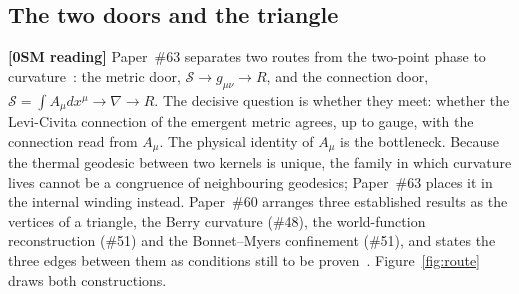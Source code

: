 \documentclass[%
 reprint, amsmath,amssymb, aps, prb, ]{revtex4-2}
\numberwithin{equation}{section}
\begin{document}
\subsection{The two doors and the triangle}

\textbf{[0SM reading]} Paper~\#63 separates two routes from the two-point phase to curvature~\cite{hanamura63}: the metric door, $\mathcal S\to g_{\mu\nu}\to R$, and the connection door, $\mathcal S = \int A_\mu dx^\mu\to\nabla\to R$. The decisive question is whether they meet: whether the Levi-Civita connection of the emergent metric agrees, up to gauge, with the connection read from $A_\mu$. The physical identity of $A_\mu$ is the bottleneck. Because the thermal geodesic between two kernels is unique, the family in which curvature lives cannot be a congruence of neighbouring geodesics; Paper~\#63 places it in the internal winding instead. Paper~\#60 arranges three established results as the vertices of a triangle, the Berry curvature (\#48), the world-function reconstruction (\#51) and the Bonnet--Myers confinement (\#51), and states the three edges between them as conditions still to be proven~\cite{hanamura60}. Figure~\ref{fig:route} draws both constructions.
\end{document}
